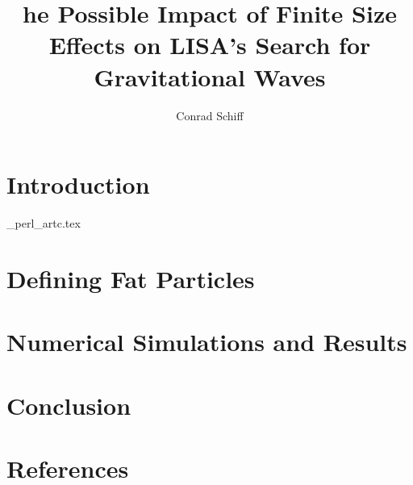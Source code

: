 \documentclass[12pt]{article}
\begin{document}
\title{he Possible Impact of Finite Size Effects on LISA's Search for Gravitational Waves}
\author{Conrad Schiff}
\maketitle

\section{Introduction}

\school\my_perl\fp_artc\intro.tex

\section{Defining Fat Particles}

\section{Numerical Simulations and Results}

\section{Conclusion}

\section{References}
\end{document}
